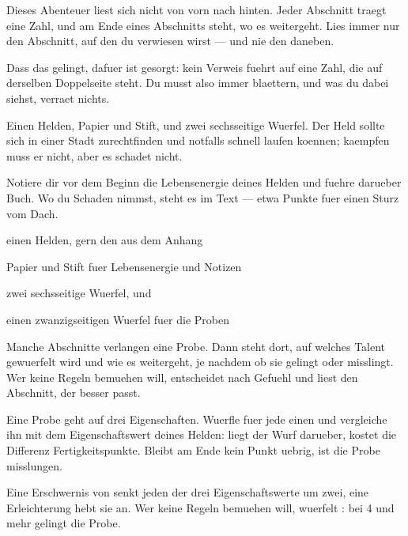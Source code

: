 \documentclass[raster]{dsa5latex}
\begin{document}



Dieses Abenteuer liest sich nicht von vorn nach hinten. Jeder Abschnitt
traegt eine Zahl, und am Ende eines Abschnitts steht, wo es weitergeht.
Lies immer nur den Abschnitt, auf den du verwiesen wirst — und nie den
daneben.

Dass das gelingt, dafuer ist gesorgt: kein Verweis fuehrt auf eine Zahl,
die auf derselben Doppelseite steht. Du musst also immer blaettern, und
was du dabei siehst, verraet nichts.


Einen Helden, Papier und Stift, und zwei sechsseitige Wuerfel. Der Held
sollte sich in einer Stadt zurechtfinden und notfalls schnell laufen
koennen; kaempfen muss er nicht, aber es schadet nicht.

Notiere dir vor dem Beginn die Lebensenergie deines Helden und fuehre
darueber Buch. Wo du Schaden nimmst, steht es im Text — etwa
 Punkte fuer einen Sturz vom Dach.

\begin{dsaliste}
\item einen Helden, gern den aus dem Anhang
\item Papier und Stift fuer Lebensenergie und Notizen
\item zwei sechsseitige Wuerfel,  und 
\item einen zwanzigseitigen Wuerfel fuer die Proben
\end{dsaliste}


Manche Abschnitte verlangen eine Probe. Dann steht dort, auf welches
Talent gewuerfelt wird und wie es weitergeht, je nachdem ob sie gelingt
oder misslingt. Wer keine Regeln bemuehen will, entscheidet nach Gefuehl
und liest den Abschnitt, der besser passt.

\begin{dsaMeisterMaske}
Eine Probe geht auf drei Eigenschaften. Wuerfle fuer jede einen
 und vergleiche ihn mit dem Eigenschaftswert deines Helden:
liegt der Wurf darueber, kostet die Differenz Fertigkeitspunkte. Bleibt am
Ende kein Punkt uebrig, ist die Probe misslungen.

Eine Erschwernis von  senkt jeden der drei Eigenschaftswerte um
zwei, eine Erleichterung hebt sie an. Wer keine Regeln bemuehen will, wuerfelt
: bei 4 und mehr gelingt die Probe.
\end{dsaMeisterMaske}
\end{document}
